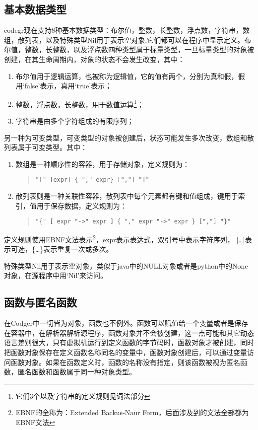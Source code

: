 \documentclass[a4paper,10pt]{article}
\begin{document}
\begin{CJK}{UTF8}{gbsn}
\subsection{基本数据类型}
codegr现在支持8种基本数据类型：布尔值，整数，长整数，浮点数，字符串，数组，散列表，以及特殊类型Nil用于表示空对象,它们都可以在程序中显示定义。布尔值，整数，长整数，以及浮点数四种类型属于标量类型，一旦标量类型的对象被创建，在其生命周期内，对象的状态不会发生改变，其中：
\begin{enumerate}
\item 布尔值用于逻辑运算，也被称为逻辑值，它的值有两个，分别为真和假，假用`false'表示，真用`true'表示；
\item 整数，浮点数，长整数，用于数值运算\footnote{它们3个以及字符串的定义规则见词法部分}；
\item 字符串是由多个字符组成的有限序列；
\end{enumerate}

另一种为可变类型，可变类型的对象被创建后，状态可能发生多次改变，数组和散列表属于可变类型。其中：
\begin{enumerate}
\item 数组是一种顺序性的容器，用于存储对象，定义规则为：
\begin{quote}
\begin{verbatim}
"[" [expr] { "," expr} [","] "]"
\end{verbatim}
\end{quote}
\item 散列表则是一种关联性容器，散列表中每个元素都有键和值组成，键用于索引，值用于保存数据，定义规则为：
\begin{quote}
\begin{verbatim}
"{" [ expr "->" expr ] { "," expr "->" expr } [","] "}"
\end{verbatim}
\end{quote}
\end{enumerate}
定义规则使用EBNF文法表示\footnote{EBNF的全称为：Extended Backus-Naur Form，后面涉及到的文法全部都为EBNF文法}，expr表示表达式，双引号中表示字符序列， [\ldots{}]表示可选，\{\ldots{}\}表示重复一次或多次。

特殊类型Nil用于表示空对象，类似于java中的NULL对象或者是python中的None对象，在源程序中用`Nil'来访问。

\subsection{函数与匿名函数}
在Codger中一切皆为对象，函数也不例外。函数可以赋值给一个变量或者是保存在容器中，在解析器解析源程序，函数对象并不会被创建，这一点可能和其它动态语言差别很大，只有虚拟机运行到定义函数的字节码时，函数对象才被创建，同时把函数对象保存在定义函数名称同名的变量中，函数对象创建后，可以通过变量访问函数对象。如果在函数定义时，函数的名称没有指定，则该函数被视为匿名函数，匿名函数和函数属于同一种对象类型。

\end{CJK}
\end{document}
